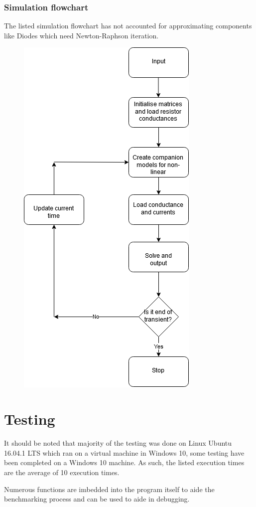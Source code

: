 \documentclass[12pt,a4paper]{article}
\begin{document}
	\subsubsection{Simulation flowchart} 
	The listed simulation flowchart has not accounted for approximating components like Diodes which need Newton-Raphson 
	iteration.
	\begin{figure} [h!]
		\centering
		\includegraphics[scale=0.5]{simulate.PNG} 
	\end{figure} 
\pagebreak

\section{Testing}
It should be noted that majority of the testing was done on Linux Ubuntu 16.04.1 LTS which ran on a virtual machine in Windows 10,
some testing have been completed on a Windows 10 machine. As such, the listed execution times are the average of 10 execution
times.
\par 
Numerous functions are imbedded into the program itself to aide the benchmarking process and can be used to aide in debugging.
\end{document}
